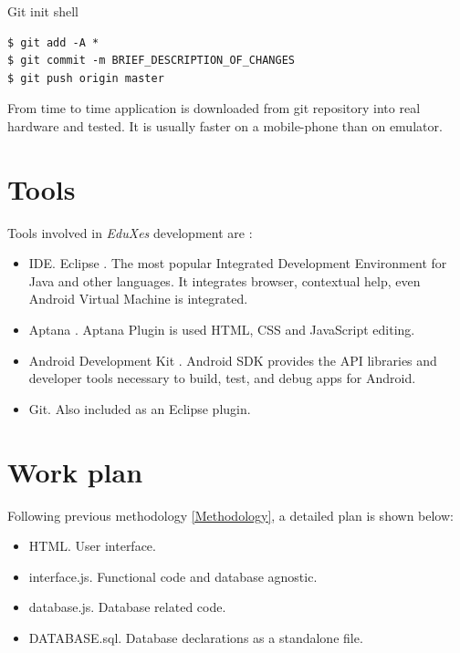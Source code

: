   \begin{bclogo}[couleur=green!30,arrondi=0.1, logo=\bcpanchant,  ombre=true ] 
{Git init shell}   
\begin{verbatim}
$ git add -A *
$ git commit -m BRIEF_DESCRIPTION_OF_CHANGES 
$ git push origin master
\end{verbatim}
\end{bclogo}

	  From time to time application is downloaded from git repository into real hardware and tested. It is usually faster on 
	  a mobile-phone than on emulator. 
	    
		\section{Tools}
	
	Tools involved in \emph{EduXes} development are :
	\begin{itemize}
	    \item IDE. Eclipse \cite{Eclipse}. The most popular Integrated Development Environment for Java and other languages. 
	    It integrates  browser, contextual help, even Android Virtual Machine is integrated.
	    \item Aptana \cite{Aptana}. Aptana Plugin is used  HTML, CSS and JavaScript editing. 
	    \item Android Development Kit \cite{AndroidDevelopmentKit}.  Android SDK provides  the API libraries and developer tools necessary to build, test, and debug apps for Android.  
	    \item Git. Also included as an Eclipse plugin.
	\end{itemize}

	


	
\section {Work plan}

Following previous methodology \ref{Methodology}, a detailed plan is shown below:
\begin{itemize}
    \item {HTML}. User interface. 
    \item {interface.js}. Functional code and database agnostic.
    \item {database.js}. Database related code.
    \item {DATABASE.sql}. Database declarations as a standalone file.
\end{itemize}

